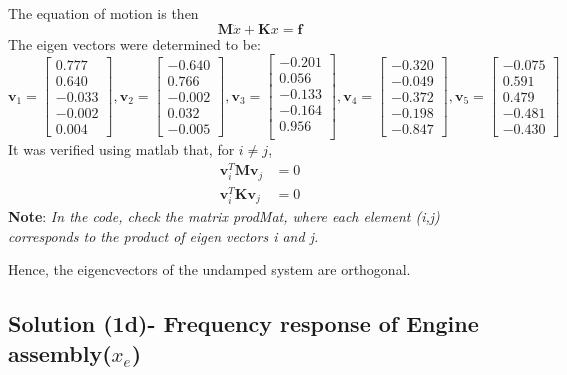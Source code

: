 \documentclass[11pt, oneside]{article}   	%
\begin{document}
The equation of motion is then $$\boldsymbol{M}\ddot{x}+\boldsymbol{K}x = \boldsymbol{f}$$
The eigen vectors were determined to be:
\[ \textbf{v}_1 = \begin{bmatrix}
 0.777 \\
0.640 \\
-0.033 \\
-0.002 \\
0.004
\end{bmatrix}, \textbf{v}_2 = \begin{bmatrix}
-0.640 \\
0.766 \\
-0.002 \\
0.032 \\
-0.005
\end{bmatrix}, \textbf{v}_3 = \begin{bmatrix}
-0.201 \\
0.056 \\
-0.133 \\
-0.164 \\
0.956 \\
\end{bmatrix}, \textbf{v}_4 = \begin{bmatrix}
-0.320 \\
-0.049 \\
-0.372 \\
-0.198 \\
-0.847
\end{bmatrix}, \textbf{v}_5 = \begin{bmatrix}
-0.075 \\
0.591 \\
0.479 \\
-0.481 \\
-0.430
\end{bmatrix}
\]
It was verified using matlab that, for $i \neq j$,
\begin{align}
 \boldsymbol{v}_i^T \boldsymbol{M} \boldsymbol{v}_j &= 0 \\ \boldsymbol{v}_i^T \boldsymbol{K} \boldsymbol{v}_j &= 0
\end{align}
\textbf{Note}: \textit{In the code, check the matrix prodMat, where each element (i,j) corresponds to the product of eigen vectors i and j.}

Hence, the eigencvectors of the undamped system are orthogonal.

\subsection{Solution (1d)- Frequency response of Engine assembly($x_e$)}
\end{document}
